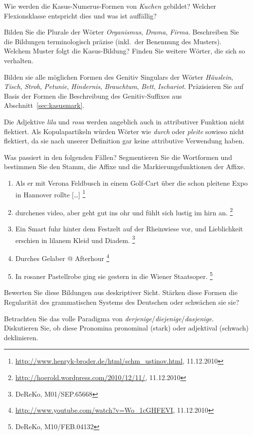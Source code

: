\begin{sloppypar}
\Uebung \label{u82} Wie werden die Kasus-Numerus-Formen von \textit{Kuchen} gebildet?
Welcher Flexionsklasse entspricht dies und was ist auffällig?

\Uebung \label{u83} Bilden Sie die Plurale der Wörter \textit{Organismus}, \textit{Drama}, \textit{Firma}.
Beschreiben Sie die Bildungen terminologisch präzise (inkl.\ der Benennung des Musters).
Welchem Muster folgt die Kasus-Bildung?
Finden Sie weitere Wörter, die sich so verhalten.

\Uebung \label{u83a} Bilden sie alle möglichen Formen des Genitiv Singulars der Wörter \textit{Häuslein}, \textit{Tisch}, \textit{Stroh}, \textit{Petunie}, \textit{Hindernis}, \textit{Brauchtum}, \textit{Bett}, \textit{Ischariot}.
Präzisieren Sie auf Basis der Formen die Beschreibung des Genitiv-Suffixes aus Abschnitt~\ref{sec:kasusmark}.

\Uebung \label{u84} Die Adjektive \textit{lila} und \textit{rosa} werden angeblich auch in attributiver Funktion nicht flektiert.
Als Kopulapartikeln würden Wörter wie \textit{durch} oder \textit{pleite} sowieso nicht flektiert, da sie nach unserer Definition gar keine attributive Verwendung haben.

Was passiert in den folgenden Fällen?
Segmentieren Sie die Wortformen und bestimmen Sie den Stamm, die Affixe und die Markierungsfunktionen der Affixe.

\begin{enumerate}\Lf
  \item Als er mit Verona Feldbusch in einem Golf-Cart über die schon pleitene Expo in Hannover rollte [\ldots]%
  \footnote{\raggedright{\url{http://www.henryk-broder.de/html/schm_ustinov.html}, 11.12.2010}}
  \item durchenes video, aber geht gut ins ohr und fühlt sich lustig im hirn an.%
  \footnote{\raggedright{\url{http://hoerold.wordpress.com/2010/12/11/}, 11.12.2010}}
  \item Ein Smart fuhr hinter dem Festzelt auf der Rheinwiese vor, und Lieblichkeit erschien in lilanem Kleid und Diadem.%
  \footnote{\raggedright{DeReKo, M01\slash SEP.65668}}
  \item Durches Gelaber @ Afterhour%
  \footnote{\raggedright{\url{http://www.youtube.com/watch?v=Wo_1cGHFEVI}, 11.12.2010}}
  \item In rosaner Pastellrobe ging sie gestern in die Wiener Staatsoper.%
  \footnote{\raggedright{DeReKo, M10\slash FEB.04132}}
\end{enumerate}

Bewerten Sie diese Bildungen aus deskriptiver Sicht.
Stärken diese Formen die Regularität des grammatischen Systems des Deutschen oder schwächen sie sie?

\Uebung[\tristar] \label{u85} Betrachten Sie das volle Paradigma von \textit{derjenige}\slash \textit{diejenige}\slash \textit{dasjenige}.
Diskutieren Sie, ob diese Pronomina pronominal (stark) oder adjektival (schwach) deklinieren.

\end{sloppypar}
